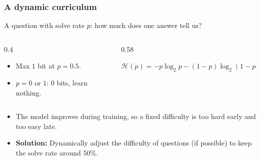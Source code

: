 \begin{frame}
    \frametitle{A dynamic curriculum}
    A question with solve rate $p$: how much does one answer tell us?
    \begin{columns}[c]
    \begin{column}{0.4\linewidth}
    \begin{itemize}
        \item Max $1$ bit at $p = 0.5$.
        \item $p = 0$ or $1$: 0 bits, learn nothing.
    \end{itemize}
    \end{column}
    \begin{column}{0.58\linewidth}
    \centering

    \vspace{-0.1cm}
    {\small $\mathcal{H}(p) = -p\log_2 p - (1-p)\log_2(1-p)$}
    \end{column}
    \end{columns}
    \pause
    \begin{itemize}
    \item The model improves during training, so a fixed difficulty is too hard early and too easy late.
    \item \textbf{Solution:} Dynamically adjust the difficulty of questions (if possible) to keep the solve rate around 50\%.
    \end{itemize}
\end{frame}

